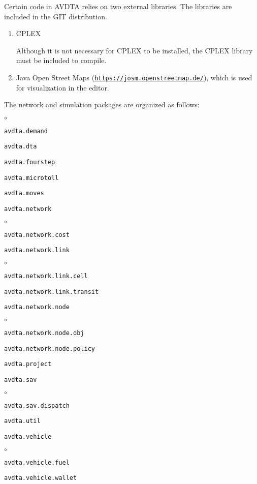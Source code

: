Certain code in AVDTA relies on two external libraries. The libraries are included in the GIT distribution.
\begin{enumerate}
	\item CPLEX
	
	Although it is not necessary for CPLEX to be installed, the CPLEX library must be included to compile.
	
	\item Java Open Street Maps (\href{https://josm.openstreetmap.de/}{\texttt{https://josm.openstreetmap.de/}}), which is used for visualization in the editor.
\end{enumerate}
The network and simulation packages are organized as follows:
\begin{list}{$\circ$}{}
	\item \texttt{avdta.demand}
	\item \texttt{avdta.dta}
	\item \texttt{avdta.fourstep}
	\item \texttt{avdta.microtoll}
	
	\item \texttt{avdta.moves}
	
	\item \texttt{avdta.network}
	
	\begin{list}{$\circ$}{}
		\item \texttt{avdta.network.cost}
		\item \texttt{avdta.network.link}
		
		\begin{list}{$\circ$}{}
			\item \texttt{avdta.network.link.cell}
			\item \texttt{avdta.network.link.transit}
		\end{list}
		
		\item \texttt{avdta.network.node}
		\begin{list}{$\circ$}{}
			\item \texttt{avdta.network.node.obj}
			\item \texttt{avdta.network.node.policy}
		\end{list}
	\end{list}
	
	\item \texttt{avdta.project}
	
	\item \texttt{avdta.sav}
	
	\begin{list}{$\circ$}{}
		\item \texttt{avdta.sav.dispatch}
	\end{list}
	
	\item \texttt{avdta.util}
	\item \texttt{avdta.vehicle}
	
	\begin{list}{$\circ$}{}
		\item \texttt{avdta.vehicle.fuel}
		\item \texttt{avdta.vehicle.wallet}
	\end{list}
\end{list}


